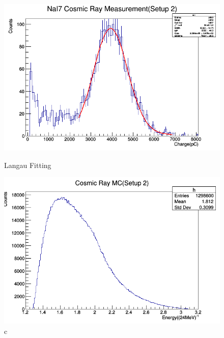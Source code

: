 \begin{figure}[H]
  \begin{minipage}{0.45\hsize}
    \begin{center}\hspace*{-1em}
  \includegraphics[width=1\textwidth]{figure/tajima/NaI7_Setup2.png}
      \caption{Langau Fitting}\label{langau}
    \end{center}
  \end{minipage}\hfill
  \begin{minipage}{0.45\hsize}
    \begin{center}
      \includegraphics[width=1\textwidth]{figure/tajima/MC2.png}
      \caption{c}\label{MC2}
    \end{center}
  \end{minipage}
\end{figure}

